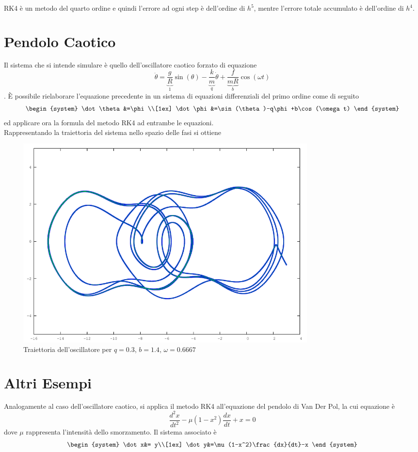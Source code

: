 RK4 è un metodo del quarto ordine e quindi l'errore ad ogni step è dell'ordine di $h^5$, mentre l'errore totale accumulato è dell'ordine di $h^4$.

\section{Pendolo Caotico}
Il sistema che si intende simulare è quello dell'oscillatore caotico forzato di equazione
$$\ddot{\theta} = \underbrace{\frac{g}{R}}_1 \sin(\theta)-\underbrace{\frac{k}{m}}_q \dot{\theta}+\underbrace{\frac{f}{mR}}_b \cos(\omega t)$$.
È possibile rielaborare l'equazione precedente in un sistema di equazioni differenziali del primo ordine come di seguito
$$\begin{system}
\dot\theta&=\phi \\[1ex] \dot\phi&=\sin(\theta)-q\phi+b\cos(\omega t)
\end{system}$$
ed applicare ora la formula del metodo RK4 ad entrambe le equazioni.
\\

Rappresentando la traiettoria del sistema nello spazio delle fasi si ottiene
\begin{figure}[H]
\centering
\includegraphics[width=0.75\textwidth]{chaotic}
\caption{Traiettoria dell'oscillatore per $q = 0.3$, $b = 1.4$, $\omega = 0.6667$}
\label{fig:chaotic}
\end{figure}

\section{Altri Esempi}
Analogamente al caso dell'oscillatore caotico, si applica il metodo RK4 all'equazione del pendolo di Van Der Pol, la cui equazione è
$$\frac{d^2x}{dt^2}-\mu(1-x^2)\frac{dx}{dt}+x= 0$$
dove $\mu$ rappresenta l'intensità dello smorzamento. Il sistema associato è
$$\begin{system}
\dot x&= y\\[1ex] \dot y&=\mu(1-x^2)\frac{dx}{dt}-x
\end{system}$$

